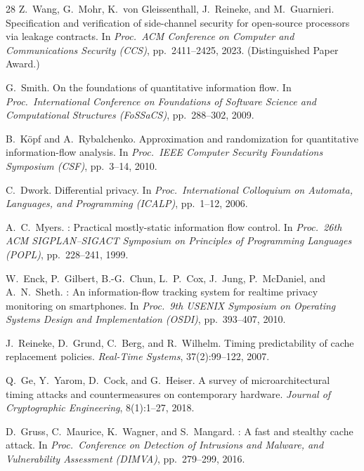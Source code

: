 \documentclass{article}
\theoremstyle{definition}
\theoremstyle{remark}
\begin{document}
\begin{thebibliography}{28}
Z.~Wang, G.~Mohr, K.~von Gleissenthall, J.~Reineke, and
  M.~Guarnieri.
\newblock Specification and verification of side-channel security for
  open-source processors via leakage contracts.
\newblock In \emph{Proc.\ ACM Conference on Computer and Communications
  Security (CCS)}, pp.\ 2411--2425, 2023.
\newblock (Distinguished Paper Award.)

G.~Smith.
\newblock On the foundations of quantitative information flow.
\newblock In \emph{Proc.\ International Conference on Foundations of Software
  Science and Computational Structures (FoSSaCS)}, pp.\ 288--302, 2009.

B.~K\"{o}pf and A.~Rybalchenko.
\newblock Approximation and randomization for quantitative information-flow
  analysis.
\newblock In \emph{Proc.\ IEEE Computer Security Foundations Symposium (CSF)},
  pp.\ 3--14, 2010.

C.~Dwork.
\newblock Differential privacy.
\newblock In \emph{Proc.\ International Colloquium on Automata, Languages, and
  Programming (ICALP)}, pp.\ 1--12, 2006.

A.~C.~Myers.
: Practical mostly-static information flow control.
\newblock In \emph{Proc.\ 26th ACM SIGPLAN--SIGACT Symposium on Principles of
  Programming Languages (POPL)}, pp.\ 228--241, 1999.

W.~Enck, P.~Gilbert, B.-G.~Chun, L.~P.~Cox, J.~Jung, P.~McDaniel, and
  A.~N.~Sheth.
: An information-flow tracking system for realtime privacy
  monitoring on smartphones.
\newblock In \emph{Proc.\ 9th USENIX Symposium on Operating Systems Design and
  Implementation (OSDI)}, pp.\ 393--407, 2010.

J.~Reineke, D.~Grund, C.~Berg, and R.~Wilhelm.
\newblock Timing predictability of cache replacement policies.
\newblock \emph{Real-Time Systems}, 37(2):99--122, 2007.

Q.~Ge, Y.~Yarom, D.~Cock, and G.~Heiser.
\newblock A survey of microarchitectural timing attacks and countermeasures on
  contemporary hardware.
\newblock \emph{Journal of Cryptographic Engineering}, 8(1):1--27, 2018.

D.~Gruss, C.~Maurice, K.~Wagner, and S.~Mangard.
: A fast and stealthy cache attack.
\newblock In \emph{Proc.\ Conference on Detection of Intrusions and Malware,
  and Vulnerability Assessment (DIMVA)}, pp.\ 279--299, 2016.


\end{thebibliography}
\end{document}
